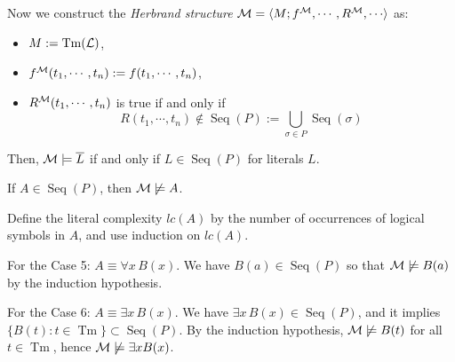 \documentclass{../../small}
\DeclareMathOperator{\Tm}{Tm}
\DeclareMathOperator{\Seq}{Seq}
\begin{document}
Now we construct the \emph{Herbrand structure} $\cM=\<M;f^\cM,\cdots,R^\cM,\cdots\>$ as:
\begin{itemize}
\item $M:=\Tm(\cL)$,
\item $f^{\mathcal{M}}(t_1,\cdots,t_n):=f(t_1,\cdots,t_n)$,
\item $R^{\mathcal{M}}(t_1,\cdots,t_n)$ is true if and only if
\[R(t_1,\cdots,t_n)\notin\Seq(P):=\bigcup_{\sigma\in P}\Seq(\sigma)\]
\end{itemize}
Then, $\mathcal{M}\models\overline{L}$ if and only if $L\in\Seq(P)$ for literals $L$.
\begin{clm*}
If $A\in\Seq(P)$, then $\mathcal{M}\not\models A$.
\end{clm*}
\begin{pf}
Define the literal complexity $lc(A)$ by the number of occurrences of logical symbols in $A$, and use induction on $lc(A)$.

For the Case 5: $A\equiv\forall x\,B(x)$.
We have $B(a)\in\Seq(P)$ so that $\mathcal{M}\not\models B(a)$ by the induction hypothesis.

For the Case 6: $A\equiv\exists x\,B(x)$.
We have $\exists x\,B(x)\in\Seq(P)$, and it implies $\{B(t):t\in\Tm\}\subset\Seq(P)$.
By the induction hypothesis, $\mathcal{M}\not\models B(t)$ for all $t\in\Tm$, hence $\mathcal{M}\not\models\exists xB(x)$.
\end{pf}

\end{document}
